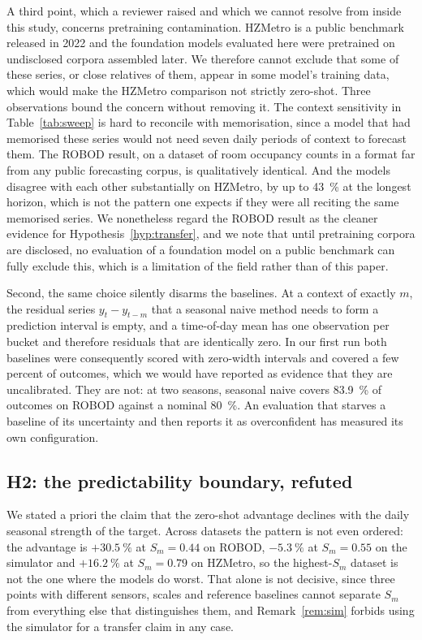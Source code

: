 \documentclass[11pt]{article}
\theoremstyle{plain}
\theoremstyle{definition}
\theoremstyle{remark}
\newif\ifrevisionmarkup
\newcommand{\new}[1]{\ifrevisionmarkup\textcolor{revision}{#1}\else#1\fi}
\begin{document}
\new{A third point, which a reviewer raised and which we cannot resolve from inside this study, concerns pretraining contamination. HZMetro is a public benchmark released in 2022 and the foundation models evaluated here were pretrained on undisclosed corpora assembled later. We therefore cannot exclude that some of these series, or close relatives of them, appear in some model's training data, which would make the HZMetro comparison not strictly zero-shot. Three observations bound the concern without removing it. The context sensitivity in Table~\ref{tab:sweep} is hard to reconcile with memorisation, since a model that had memorised these series would not need seven daily periods of context to forecast them. The ROBOD result, on a dataset of room occupancy counts in a format far from any public forecasting corpus, is qualitatively identical. And the models disagree with each other substantially on HZMetro, by up to \SI{43}{\percent} at the longest horizon, which is not the pattern one expects if they were all reciting the same memorised series. We nonetheless regard the ROBOD result as the cleaner evidence for Hypothesis~\ref{hyp:transfer}, and we note that until pretraining corpora are disclosed, no evaluation of a foundation model on a public benchmark can fully exclude this, which is a limitation of the field rather than of this paper.}

Second, the same choice silently disarms the baselines. At a context of exactly $m$, the residual series $y_t - y_{t-m}$ that a seasonal naive method needs to form a prediction interval is empty, and a time-of-day mean has one observation per bucket and therefore residuals that are identically zero. In our first run both baselines were consequently scored with zero-width intervals and covered a few percent of outcomes, which we would have reported as evidence that they are uncalibrated. They are not: at two seasons, seasonal naive covers \SI{83.9}{\percent} of outcomes on ROBOD against a nominal \SI{80}{\percent}. An evaluation that starves a baseline of its uncertainty and then reports it as overconfident has measured its own configuration.

\subsection{H2: the predictability boundary, refuted}

We \new{stated a priori} the claim that the zero-shot advantage declines with the daily seasonal strength of the target. Across datasets the pattern is not even ordered: the advantage is $+\SI{30.5}{\percent}$ at $S_m=0.44$ on ROBOD, $-\new{\SI{5.3}{\percent}}$ at $S_m=0.55$ on the simulator and $+\SI{16.2}{\percent}$ at $S_m=0.79$ on HZMetro, so the highest-$S_m$ dataset is not the one where the models do worst. That alone is not decisive, since three points with different sensors, scales and reference baselines cannot separate $S_m$ from everything else that distinguishes them, and Remark~\ref{rem:sim} forbids using the simulator for a transfer claim in any case.
\end{document}
